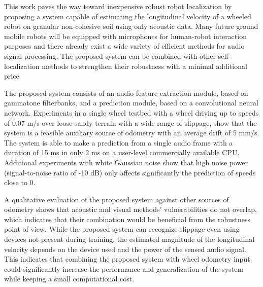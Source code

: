 This work paves the way toward inexpensive robust robot localization by
proposing a system capable of estimating the longitudinal velocity of a wheeled
robot on granular non-cohesive soil using only acoustic data. Many future
ground mobile robots will be equipped with microphones for human-robot
interaction purposes and there already exist a wide variety of efficient
methods for audio signal processing. The proposed system can be combined with
other self-localization methods to strengthen their robustness with a minimal
additional price.

The proposed system consists of an audio feature extraction module, based on
gammatone filterbanks, and a prediction module, based on a convolutional neural
network. Experiments in a single wheel testbed with a wheel driving up to
speeds of 0.07 m/s over loose sandy terrain with a wide range of slippage, show
that the system is a feasible auxiliary source of odometry with an average
drift of 5 mm/s. The system is able to make a prediction from a single audio
frame with a duration of 15 ms in only 2 ms on a user-level commercially
available CPU. Additional experiments with white Gaussian noise show that high
noise power (signal-to-noise ratio of -10 dB) only affects significantly the
prediction of speeds close to 0.

A qualitative evaluation of the proposed system against other sources of
odometry shows that acoustic and visual methods' vulnerabilities do not
overlap, which indicates that their combination would be beneficial from the
robustness point of view. While the proposed system can recognize slippage even
using devices not present during training, the estimated magnitude of the
longitudinal velocity depends on the device used and the power of the sensed
audio signal. This indicates that combining the proposed system with wheel
odometry input could significantly increase the performance and generalization
of the system while keeping a small computational cost.